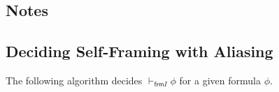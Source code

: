 \documentclass{article}
\newcommand{\tsf}{\textsf}
\newcommand{\frames}{\vDash_I}
\newcommand{\selfframes}{\vdash_{\tsf{frm}I}}
\renewcommand{\empty}{\varnothing}
\begin{document}
\subsection{Notes}

\subsection{Deciding Self-Framing with Aliasing}

\noindent
The following algorithm decides $\selfframes \phi$ for a given formula $\phi$.

\end{document}
